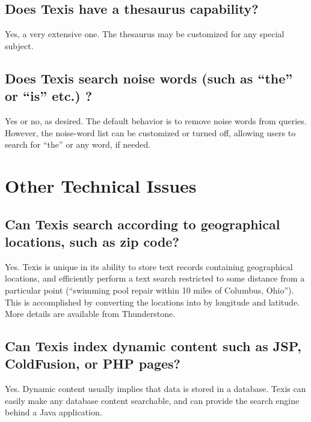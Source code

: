 \section{Does Texis have a thesaurus capability? }

Yes, a very extensive one.  The thesaurus may be customized for any
special subject.

\section{Does Texis search noise words (such as ``the'' or ``is'' etc.) ? }

Yes or no, as desired.  The default behavior is to remove noise words
from queries.  However, the noise-word list can be customized or
turned off, allowing users to search for ``the'' or any word, if
needed.

\chapter{Other Technical Issues}

\section{Can Texis search according to geographical locations, such as zip code? }

Yes.  Texis is unique in its ability to store text records containing
geographical locations, and efficiently perform a text search
restricted to some distance from a particular point (``swimming pool
repair within 10 miles of Columbus, Ohio'').  This is accomplished by
converting the locations into by longitude and latitude.  More details
are available from Thunderstone.

\section{Can Texis index dynamic content such as JSP, ColdFusion, or PHP pages? }

Yes.  Dynamic content usually implies that data is stored in a
database.  Texis can easily make any database content searchable, and
can provide the search engine behind a Java application.


